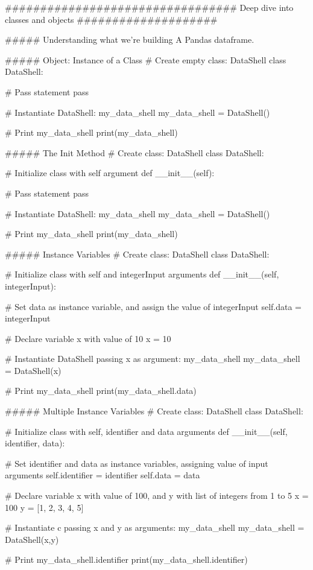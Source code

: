 ################################# Deep dive into classes and objects ####################

##### Understanding what we're building
A Pandas dataframe.


##### Object: Instance of a Class
# Create empty class: DataShell
class DataShell:
  
    # Pass statement
    pass

# Instantiate DataShell: my_data_shell
my_data_shell = DataShell()

# Print my_data_shell
print(my_data_shell)


##### The Init Method
# Create class: DataShell
class DataShell:
  
	# Initialize class with self argument
    def __init__(self):
      
        # Pass statement
        pass

# Instantiate DataShell: my_data_shell
my_data_shell = DataShell()

# Print my_data_shell
print(my_data_shell)


##### Instance Variables
# Create class: DataShell
class DataShell:
  
	# Initialize class with self and integerInput arguments
    def __init__(self, integerInput):
      
		# Set data as instance variable, and assign the value of integerInput
        self.data = integerInput

# Declare variable x with value of 10
x = 10      

# Instantiate DataShell passing x as argument: my_data_shell
my_data_shell = DataShell(x)

# Print my_data_shell
print(my_data_shell.data)


##### Multiple Instance Variables
# Create class: DataShell
class DataShell:
  
	# Initialize class with self, identifier and data arguments
    def __init__(self, identifier, data):
      
		# Set identifier and data as instance variables, assigning value of input arguments
        self.identifier = identifier
        self.data = data

# Declare variable x with value of 100, and y with list of integers from 1 to 5
x = 100
y = [1, 2, 3, 4, 5]

# Instantiate c passing x and y as arguments: my_data_shell
my_data_shell = DataShell(x,y)

# Print my_data_shell.identifier
print(my_data_shell.identifier)

